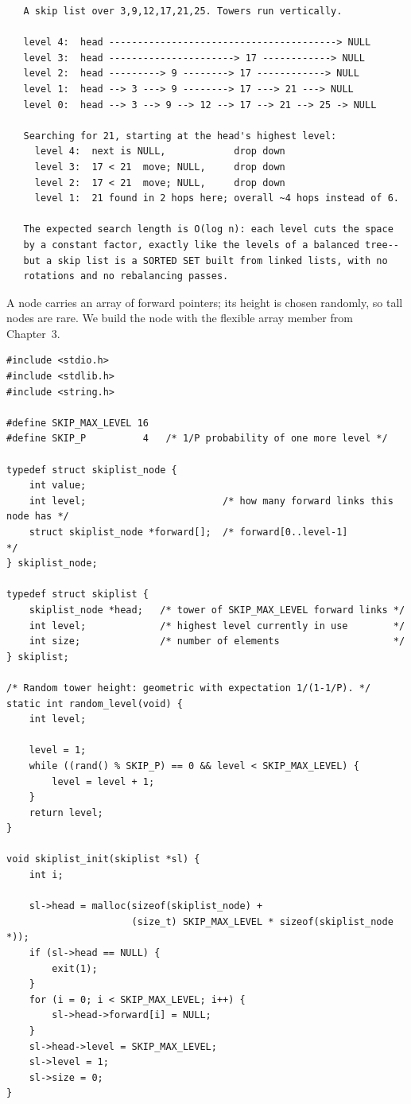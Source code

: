 \begin{verbatim}
   A skip list over 3,9,12,17,21,25. Towers run vertically.

   level 4:  head ----------------------------------------> NULL
   level 3:  head ----------------------> 17 ------------> NULL
   level 2:  head ---------> 9 --------> 17 ------------> NULL
   level 1:  head --> 3 ---> 9 --------> 17 ---> 21 ---> NULL
   level 0:  head --> 3 --> 9 --> 12 --> 17 --> 21 --> 25 -> NULL

   Searching for 21, starting at the head's highest level:
     level 4:  next is NULL,            drop down
     level 3:  17 < 21  move; NULL,     drop down
     level 2:  17 < 21  move; NULL,     drop down
     level 1:  21 found in 2 hops here; overall ~4 hops instead of 6.

   The expected search length is O(log n): each level cuts the space
   by a constant factor, exactly like the levels of a balanced tree--
   but a skip list is a SORTED SET built from linked lists, with no
   rotations and no rebalancing passes.
\end{verbatim}

A node carries an array of forward pointers; its height is chosen
randomly, so tall nodes are rare. We build the node with the flexible
array member from Chapter~3.

\begin{lstlisting}[caption={The skip list structures.}]
#include <stdio.h>
#include <stdlib.h>
#include <string.h>

#define SKIP_MAX_LEVEL 16
#define SKIP_P          4   /* 1/P probability of one more level */

typedef struct skiplist_node {
    int value;
    int level;                        /* how many forward links this node has */
    struct skiplist_node *forward[];  /* forward[0..level-1]                 */
} skiplist_node;

typedef struct skiplist {
    skiplist_node *head;   /* tower of SKIP_MAX_LEVEL forward links */
    int level;             /* highest level currently in use        */
    int size;              /* number of elements                    */
} skiplist;

/* Random tower height: geometric with expectation 1/(1-1/P). */
static int random_level(void) {
    int level;

    level = 1;
    while ((rand() % SKIP_P) == 0 && level < SKIP_MAX_LEVEL) {
        level = level + 1;
    }
    return level;
}

void skiplist_init(skiplist *sl) {
    int i;

    sl->head = malloc(sizeof(skiplist_node) +
                      (size_t) SKIP_MAX_LEVEL * sizeof(skiplist_node *));
    if (sl->head == NULL) {
        exit(1);
    }
    for (i = 0; i < SKIP_MAX_LEVEL; i++) {
        sl->head->forward[i] = NULL;
    }
    sl->head->level = SKIP_MAX_LEVEL;
    sl->level = 1;
    sl->size = 0;
}
\end{lstlisting}

